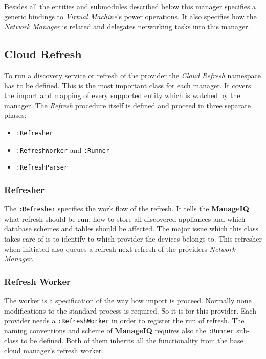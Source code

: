 Besides all the entities and submodules described below this manager specifies a generic bindings to \emph{Virtual Machine}'s power operations. It also specifies how the \emph{Network Manager} is related and delegates networking tasks into this manager.

\subsection{Cloud Refresh}
\label{sub:Cloud Refresh}

To run a discovery service or refresh of the provider the \emph{Cloud Refresh} namespace has to be defined. This is the most important class for each manager. It covers the import and mapping of every supported entity which is watched by the manager. The \emph{Refresh} procedure itself is defined and proceed in three separate phases:

\begin{itemize}
	\item \verb|:Refresher|
	\item \verb|:RefreshWorker| and \verb|:Runner|
	\item \verb|:RefreshParser|
\end{itemize}

\subsubsection{Refresher}
\label{subs:Refresher}

The \verb|:Refresher| specifies the work flow of the refresh. It tells the \textbf{ManageIQ} what refresh should be run, how to store all discovered appliances and which database schemes and tables should be affected. The major issue which this class takes care of is to identify to which provider the devices belongs to. This refresher when initiated also queues a refresh next refresh of the providers \emph{Network Manager}.

\subsubsection{Refresh Worker}
\label{subs:Refresh Worker}

The worker is a specification of the way how import is proceed. Normally none modifications to the standard process is required. So it is for this provider. Each provider needs a \verb|:RefreshWorker| in order to register the run of refresh. The naming conventions and scheme of \textbf{ManageIQ} requires also the \verb|:Runner| sub-class to be defined. Both of them inherits all the functionality from the base cloud manager's refresh worker.

